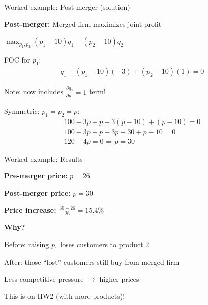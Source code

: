 \documentclass[notes,11pt, aspectratio=169]{beamer}
\newenvironment{wideitemize}{\itemize\addtolength{\itemsep}{10pt}}{\enditemize}
\begin{document}
\begin{frame}{Worked example: Post-merger (solution)}
	\begin{wideitemize}
		\item \textbf{Post-merger:} Merged firm maximizes joint profit
		\item $\max_{p_1, p_2} (p_1 - 10)q_1 + (p_2 - 10)q_2$
		\item FOC for $p_1$:
		\begin{align*}
			q_1 + (p_1 - 10)(-3) + (p_2 - 10)(1) = 0
		\end{align*}
		\item Note: now includes $\frac{\partial q_2}{\partial p_1} = 1$ term!
		\item Symmetric: $p_1 = p_2 = p$:
		\begin{align*}
			100 - 3p + p - 3(p - 10) + (p - 10) = 0 \\
			100 - 3p + p - 3p + 30 + p - 10 = 0 \\
			120 - 4p = 0 \Rightarrow p = 30
		\end{align*}
	\end{wideitemize}
\end{frame}

\begin{frame}{Worked example: Results}
	\begin{wideitemize}
		\item \textbf{Pre-merger price:} $p = 26$
		\item \textbf{Post-merger price:} $p = 30$
		\item \textbf{Price increase:} $\frac{30 - 26}{26} = 15.4\%$
		\item \textbf{Why?}
		\begin{wideitemize}
			\vspace{5pt}
			\item Before: raising $p_1$ loses customers to product 2
			\item After: those ``lost'' customers still buy from merged firm
			\item Less competitive pressure $\rightarrow$ higher prices
		\end{wideitemize}
		\item This is on HW2 (with more products)!
	\end{wideitemize}
\end{frame}
\end{document}
